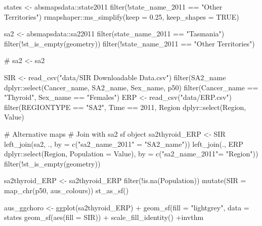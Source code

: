\begin{Schunk}
\begin{Sinput}
states <- absmapsdata::state2011 %
  filter(!state_name_2011 == "Other Territories") %
  rmapshaper::ms_simplify(keep = 0.25, keep_shapes = TRUE)

sa2 <- absmapsdata::sa22011 %
  filter(state_name_2011 == "Tasmania") %
  filter(!st_is_empty(geometry)) %
  filter(!state_name_2011 == "Other Territories")

# sa2 <- sa2 %

SIR <- read_csv("data/SIR Downloadable Data.csv") %
  filter(SA2_name %
  dplyr::select(Cancer_name, SA2_name, Sex_name, p50) %
  filter(Cancer_name == "Thyroid", Sex_name == "Females")
ERP <- read_csv("data/ERP.csv") %
  filter(REGIONTYPE == "SA2", Time == 2011, Region %
  dplyr::select(Region, Value)

# Alternative maps
# Join with sa2 sf object
sa2thyroid_ERP <- SIR %
  left_join(sa2, ., by = c("sa2_name_2011" = "SA2_name")) %
  left_join(., ERP %
              dplyr::select(Region, 
              Population = Value), by = c("sa2_name_2011"= "Region")) %
  filter(!st_is_empty(geometry))

sa2thyroid_ERP <- sa2thyroid_ERP %
  filter(!is.na(Population)) %
  mutate(SIR = map_chr(p50, aus_colours)) %
  st_as_sf() 

aus_ggchoro <- ggplot(sa2thyroid_ERP) + 
  geom_sf(fill = "lightgrey", data = states %
  geom_sf(aes(fill = SIR)) + 
  scale_fill_identity() +invthm
\end{Sinput}
\end{Schunk}

